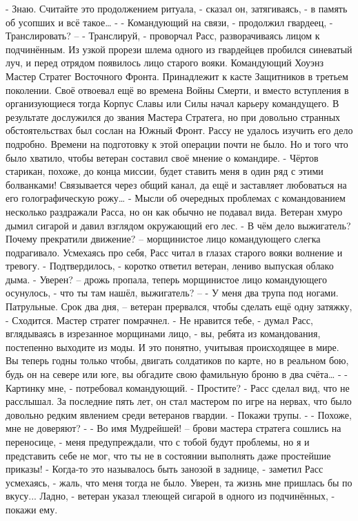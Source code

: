 \documentclass[a4paper, 12pt]{report}
\begin{document}
	- Знаю. Считайте это продолжением ритуала, - сказал он, затягиваясь, - в память об усопших и всё такое… -
- Командующий на связи, - продолжил гвардеец, - Транслировать? –
	- Транслируй, - проворчал Расс, разворачиваясь лицом к подчинённым. Из узкой прорези шлема одного из гвардейцев пробился синеватый луч, и перед отрядом появилось лицо старого вояки.
	Командующий Хоуэнз Мастер Стратег Восточного Фронта. Принадлежит к касте Защитников в третьем поколении. Своё отвоевал ещё во времена Войны Смерти, и вместо вступления в организующиеся тогда Корпус Славы или Силы начал карьеру командущего. В результате дослужился до звания Мастера Стратега, но при довольно странных обстоятельствах был сослан на Южный Фронт. Рассу не удалось изучить его дело подробно. Времени на подготовку к этой операции почти не было. Но и того что было хватило, чтобы ветеран составил своё мнение о командире.
	- Чёртов старикан, похоже, до конца миссии, будет ставить меня в один ряд с этими болванками! Связывается через общий канал, да ещё и заставляет любоваться на его голографическую рожу… - Мысли об очередных проблемах с командованием несколько раздражали Расса, но он как обычно не подавал вида. Ветеран хмуро дымил сигарой и давил взглядом окружающий его лес.
- В чём дело выжигатель? Почему прекратили движение? – морщинистое лицо командующего слегка подрагивало. Усмехаясь про себя, Расс читал в глазах старого вояки волнение и тревогу.
	- Подтвердилось, - коротко ответил ветеран, лениво выпуская облако дыма.
	- Уверен? – дрожь пропала, теперь морщинистое лицо командующего осунулось, - что ты там нашёл, выжигатель? –
	- У меня два трупа под ногами. Патрульные. Срок два дня, – ветеран прервался, чтобы сделать ещё одну затяжку, - Сходится.
	Мастер стратег помрачнел. 
- Не нравится тебе, - думал Расс, вглядываясь в изрезанное морщинами лицо, - вы, ребята из командования, постепенно выходите из моды. И это понятно, учитывая происходящее в мире. Вы теперь годны только чтобы, двигать солдатиков по карте, но в реальном бою, будь он на севере или юге, вы обгадите свою фамильную броню в два счёта… -
	- Картинку мне, - потребовал командующий.
	- Простите? - Расс сделал вид, что не расслышал. За последние пять лет, он стал мастером по игре на нервах, что было довольно редким явлением среди ветеранов гвардии. 
	- Покажи трупы. - 
	- Похоже, мне не доверяют? -  
	- Во имя Мудрейшей! – брови мастера стратега сошлись на переносице, - меня предупреждали, что с тобой будут проблемы, но я и представить себе не мог, что ты не в состоянии выполнять даже простейшие приказы! 
	- Когда-то это называлось быть занозой в заднице, - заметил Расс усмехаясь, - жаль, что меня тогда не было. Уверен, та жизнь мне пришлась бы по вкусу... Ладно, - ветеран указал тлеющей сигарой в одного из подчинённых, - покажи ему.
\end{document}
